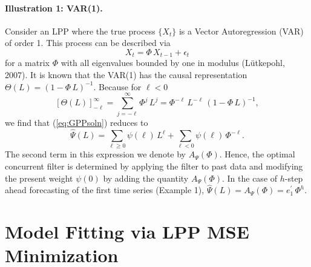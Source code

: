 \documentclass[a4paper]{book}
\begin{document}
\paragraph{Illustration 1:  VAR(1).}  Consider an LPP where the true process $\{ X_t \}$
 is a Vector Autoregression (VAR) of order 1.  This process can be described via
\[
  X_t = \Phi \, X_{t-1} + \epsilon_t
\]
 for a matrix $\Phi$ with all eigenvalues bounded by one in modulus (L\"utkepohl, 2007).  It is known
 that the VAR(1) has the causal representation  $\Theta (L) = {(1 - \Phi \, L )}^{-1}$.  Because
 for $\ell < 0$ 
\[
   { [ \Theta (L) ]}_{-\ell}^{ \infty  } = \sum_{j = -\ell}^{\infty} \Phi^j \, L^j 
  = \Phi^{-\ell} \, L^{-\ell} \, {( 1 - \Phi \, L )}^{-1},
\]
 we find that (\ref{eq:GPPsoln}) reduces to
\[
  \widehat{\Psi} (L) =   \sum_{\ell \geq 0 } \psi (\ell) \, L^{\ell} +
	\sum_{\ell < 0} \psi (\ell) \, \Phi^{-\ell}.
\]
  The second term in this expression we denote by $A_{\Psi} (\Phi)$.  Hence, the optimal
 concurrent filter is determined by applying the filter to past data and modifying the
 present weight $\psi (0)$ by adding the quantity $A_{\Psi} (\Phi)$.  In the case of
 $h$-step ahead forecasting of the first time series (Example 1), $\widehat{\Psi} (L)
 = A_{\Psi} (\Phi) = e_1^{\prime} \, \Phi^h$.



\section{Model Fitting via LPP MSE Minimization}
\end{document}
